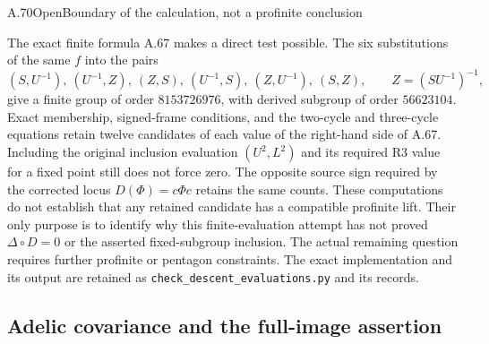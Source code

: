 \begin{statement}{A.70}{Open}{Boundary of the calculation, not a profinite conclusion}
\end{statement}
The exact finite formula A.67 makes a direct test possible. The
six substitutions of the same $f$ into the pairs
\[
 (S,U^{-1}),\ (U^{-1},Z),\ (Z,S),\
 (U^{-1},S),\ (Z,U^{-1}),\ (S,Z),\qquad Z=(SU^{-1})^{-1},
\]
give a finite group of order $8153726976$, with derived subgroup of
order $56623104$. Exact membership, signed-frame conditions, and
the two-cycle and three-cycle equations retain twelve candidates
of each value of the right-hand side of A.67. Including the original
inclusion evaluation $(U^2,L^2)$ and its required R3 value for a fixed
point still does not force zero. The opposite source sign required by
the corrected locus $D(\Phi)=c\Phi c$ retains the same counts.
These computations do not establish
that any retained candidate has a compatible profinite lift. Their
only purpose is to identify why this finite-evaluation attempt has
not proved $\Delta\circ D=0$ or the asserted fixed-subgroup inclusion.
The actual remaining question requires further profinite or pentagon
constraints. The exact implementation and its output are retained
as \texttt{check\_descent\_evaluations.py} and its records.

\subsection{Adelic covariance and the full-image assertion}


